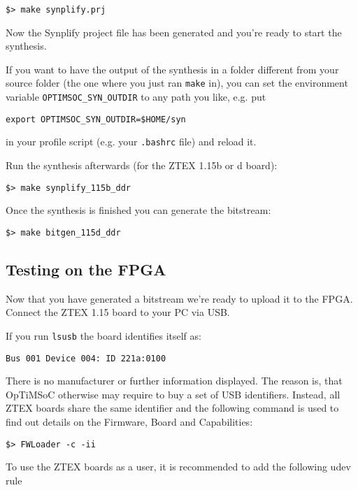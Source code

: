\begin{lstlisting}
$> make synplify.prj
\end{lstlisting}

Now the Synplify project file has been generated and you're ready to start the
synthesis.

If you want to have the output of the synthesis in a folder different from your
source folder (the one where you just ran \verb|make| in), you can set the
environment variable \verb|OPTIMSOC_SYN_OUTDIR| to any path you like, e.g. put
\begin{lstlisting}
export OPTIMSOC_SYN_OUTDIR=$HOME/syn
\end{lstlisting}
in your profile script (e.g. your \verb|.bashrc| file) and reload it.

Run the synthesis afterwards (for the ZTEX 1.15b or d board):

\begin{lstlisting}
$> make synplify_115b_ddr
\end{lstlisting}

Once the synthesis is finished you can generate the bitstream:

\begin{lstlisting}
$> make bitgen_115d_ddr
\end{lstlisting}

\subsection{Testing on the FPGA}
Now that you have generated a bitstream we're ready to upload it to the FPGA.
Connect the ZTEX 1.15 board to your PC via USB.

If you run \verb|lsusb| the board identifies itself as:

\begin{lstlisting}
Bus 001 Device 004: ID 221a:0100
\end{lstlisting}

There is no manufacturer or further information displayed. The reason
is, that OpTiMSoC otherwise may require to buy a set of USB
identifiers. Instead, all ZTEX boards share the same identifier and
the following command is used to find out details on the Firmware,
Board and Capabilities:

\begin{lstlisting}
$> FWLoader -c -ii
\end{lstlisting}

To use the ZTEX boards as a user, it is recommended to add the following
udev rule


